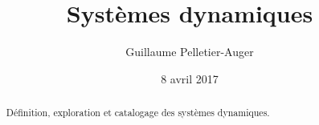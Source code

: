 \documentclass[10pt]{article}
\author{Guillaume Pelletier-Auger}
\title{Systèmes dynamiques}
\date{8 avril 2017}
\begin{document}
\maketitle
\begin{abstract}
    Définition, exploration et catalogage des systèmes dynamiques.
\end{abstract}


% 
% 
\end{document}
